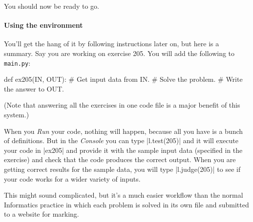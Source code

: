 You should now be ready to go.

\paragraph{Using the \learninformatics{} environment} You'll get the hang of it by following
instructions later on, but here is a summary. Say you are working on exercise 205. You
will add the following to \texttt{main.py}:
\begin{pythoncode}
  def ex205(IN, OUT):
    # Get input data from IN.
    # Solve the problem.
    # Write the answer to OUT.
\end{pythoncode}

(Note that answering all the exercises in one code file is a major benefit of this
system.)

When you \emph{Run} your code, nothing will happen, because all you have is a bunch of
definitions. But in the \emph{Console} you can type \pycode|l.test(205)| and it will
execute your code in \pycode|ex205| and provide it with the sample input data (specified
in the exercise) and check that the code produces the correct output. When you are getting
correct results for the sample data, you will type \pycode|l.judge(205)| to see if your
code works for a wider variety of inputs.

This might sound complicated, but it's a much easier workflow than the normal Informatics
practice in which each problem is solved in its own file and submitted to a website for
marking.

